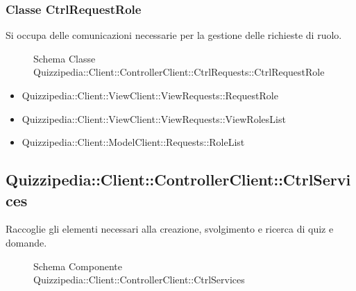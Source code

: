 \subsubsection{Classe CtrlRequestRole}
Si occupa delle comunicazioni necessarie per la gestione delle richieste di ruolo.
\begin{figure}[H]
\centering
\noindent{}
\caption{Schema Classe Quizzipedia::Client::ControllerClient::CtrlRequests::CtrlRequestRole}
\end{figure}
\begin{itemize}
\item Quizzipedia::Client::ViewClient::ViewRequests::RequestRole
\item Quizzipedia::Client::ViewClient::ViewRequests::ViewRolesList
\end{itemize}
\begin{itemize}
\item Quizzipedia::Client::ModelClient::Requests::RoleList
\end{itemize}
\subsection{Quizzipedia::Client::ControllerClient::CtrlServices}
Raccoglie gli elementi necessari alla creazione, svolgimento e ricerca di quiz e domande.
\begin{figure}[H]
\centering
\noindent{}
\caption[Quizzipedia::Client::ControllerClient::CtrlServices]{Schema Componente Quizzipedia::Client::ControllerClient::CtrlServices}
\end{figure}
